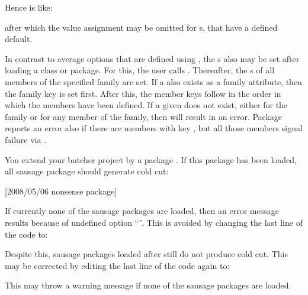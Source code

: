 \begin{Declaration}
\end{Declaration}
%
Hence  is like:
after which the value assignment may be omitted for s, that have a
defined default.

In contrast to average options that are defined using ,
the s also may be set after loading a class or package. For this,
the user calls . Thereafter, the s of all
members of the specified family are set. If a  also exists as a
family attribute, then the family key is set first. After this, the member
keys follow in the order in which the members have been defined. If a given
 does not exist, either for the family or for any member of the
family, then  will result in an error. Package
 reports an error also if there are members with key
, but all those members signal failure via .
\begin{Example}
  You extend your butcher project by a package . If this
  package has been loaded, all sausage package should generate cold cut:
\begin{lstcode}
                  [2008/05/06 nonsense package]
  \relax
\end{lstcode}
  If currently none of the sausage packages are loaded, then an error
  message results because of undefined option ``''. This is
  avoided by changing the last line of the code to:
\begin{lstcode}[moretexcs={Family@Options}]
\end{lstcode}
  Despite this, sausage packages loaded after
   still do not produce cold cut. This may be corrected
  by editing the last line of the code again to:
\begin{lstcode}[moretexcs={Family@Options}]
\end{lstcode}
  This may throw a warning message if none of the sausage packages are loaded.
\end{Example}
%
%



